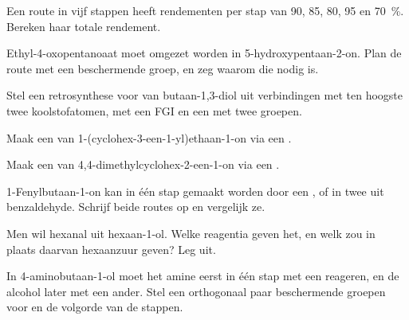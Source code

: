 \begin{exercise}[$\star$]\label{exo:b2:retrosynthesis:3}
Een route in vijf stappen heeft rendementen per stap van 90, 85, 80, 95 en 70~\%. Bereken haar totale rendement.
\end{exercise}

\begin{exercise}[$\star$]\label{exo:b2:retrosynthesis:4}
Ethyl-4-oxopentanoaat moet omgezet worden in 5-hydroxypentaan-2-on. Plan de route met een beschermende
groep, en zeg waarom die nodig is.
\end{exercise}

\begin{exercise}[$\star\star$]\label{exo:b2:retrosynthesis:5}
Stel een retrosynthese voor van butaan-1,3-diol uit verbindingen met ten hoogste twee koolstofatomen, met een FGI en een
 met twee groepen.
\end{exercise}

\begin{exercise}[$\star\star$]\label{exo:b2:retrosynthesis:6}
Maak een  van 1-(cyclohex-3-een-1-yl)ethaan-1-on via een .
\end{exercise}

\begin{exercise}[$\star\star$]\label{exo:b2:retrosynthesis:7}
Maak een  van 4,4-dimethylcyclohex-2-een-1-on via een .
\end{exercise}

\begin{exercise}[$\star\star$]\label{exo:b2:retrosynthesis:8}
1-Fenylbutaan-1-on kan in één stap gemaakt worden door een , of in twee uit benzaldehyde.
Schrijf beide routes op en vergelijk ze.
\end{exercise}

\begin{exercise}[$\star\star$]\label{exo:b2:retrosynthesis:9}
Men wil hexanal uit hexaan-1-ol. Welke reagentia geven het, en welk zou in plaats daarvan hexaanzuur
geven? Leg uit.
\end{exercise}

\begin{exercise}[$\star\star\star$]\label{exo:b2:retrosynthesis:10}
In 4-aminobutaan-1-ol moet het amine eerst in één stap met een  reageren, en de alcohol
later met een ander. Stel een orthogonaal paar beschermende groepen voor en de volgorde van de stappen.
\end{exercise}

